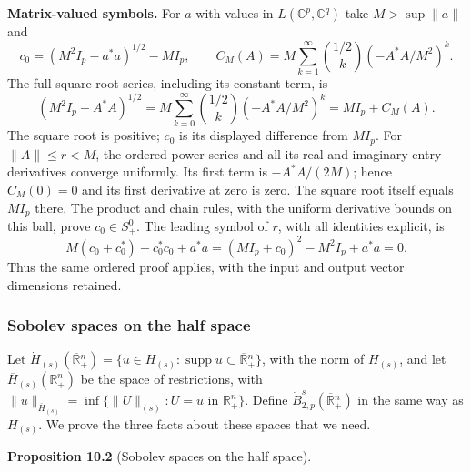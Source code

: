 \documentclass[
  11pt,
]{article}
\begin{document}
\textbf{Matrix-valued symbols.} For \(a\) with values in
\(L(\mathbb C^p,\mathbb C^q)\) take \(M>\sup\|a\|\) and \[
 c_0=(M^2I_p-a^*a)^{1/2}-M I_p,
 \qquad
 C_M(A)=M\sum_{k=1}^\infty\binom{1/2}{k}
                (-A^*A/M^2)^k .
\] The full square-root series, including its constant term, is \[
 (M^2I_p-A^*A)^{1/2}
 =M\sum_{k=0}^\infty\binom{1/2}{k}(-A^*A/M^2)^k
 =M I_p+C_M(A).
\] The square root is positive; \(c_0\) is its displayed difference from
\(M I_p\). For \(\|A\|\le r<M\), the ordered power series and all its
real and imaginary entry derivatives converge uniformly. Its first term
is \(-A^*A/(2M)\); hence \(C_M(0)=0\) and its first derivative at zero
is zero. The square root itself equals \(M I_p\) there. The product and
chain rules, with the uniform derivative bounds on this ball, prove
\(c_0\in S^0_+\). The leading symbol of \(r\), with all identities
explicit, is \[
 M(c_0+c_0^*)+c_0^*c_0+a^*a
 =(M I_p+c_0)^2-M^2I_p+a^*a=0 .
\] Thus the same ordered proof applies, with the input and output vector
dimensions retained.

\subsubsection{Sobolev spaces on the half
space}\label{sobolev-spaces-on-the-half-space}

Let
\(\dot H_{(s)}(\overline{\mathbb R}{}^n_+)=\{u\in H_{(s)}:\operatorname{supp}u\subset\overline{\mathbb R}{}^n_+\}\),
with the norm of \(H_{(s)}\), and let
\(\overline H_{(s)}(\mathbb R^n_+)\) be the space of restrictions, with
\(\|u\|_{\overline H_{(s)}}=\inf\{\|U\|_{(s)}:U=u\text{ in }\mathbb R^n_+\}\).
Define \(\dot B^s_{2,p}(\overline{\mathbb R}{}^n_+)\) in the same way as
\(\dot H_{(s)}\). We prove the three facts about these spaces that we
need.

\textbf{Proposition 10.2} (Sobolev spaces on the half space).
\end{document}
